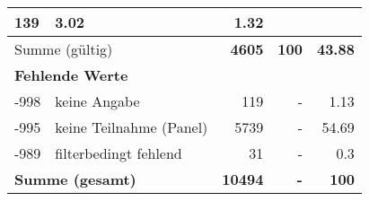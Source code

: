 \begin{longtable}{lXrrr}
       \num{139} &
       \num[round-mode=places,round-precision=2]{3.02} &
         \num[round-mode=places,round-precision=2]{1.32} \\
     \midrule
     \multicolumn{2}{l}{Summe (gültig)} &
       \textbf{\num{4605}} &
     \textbf{\num{100}} &
       \textbf{\num[round-mode=places,round-precision=2]{43.88}} \\
     \multicolumn{5}{l}{\textbf{Fehlende Werte}}\\
       -998 &
       keine Angabe &
         \num{119} &
        - &
         \num[round-mode=places,round-precision=2]{1.13} \\
       -995 &
       keine Teilnahme (Panel) &
         \num{5739} &
        - &
         \num[round-mode=places,round-precision=2]{54.69} \\
       -989 &
       filterbedingt fehlend &
         \num{31} &
        - &
         \num[round-mode=places,round-precision=2]{0.3} \\
     \midrule
     \multicolumn{2}{l}{\textbf{Summe (gesamt)}} &
          \textbf{\num{10494}} &
        \textbf{-} &
        \textbf{\num{100}} \\
     \bottomrule
     \end{longtable}
     
